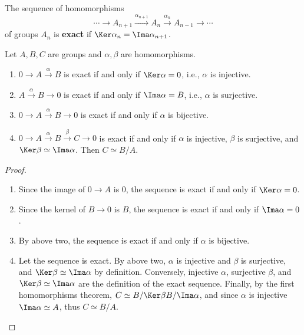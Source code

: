 \begin{defn}
The sequence of homomorphisms
\begin{equation}
\cdots\rightarrow A_{n+1}\xrightarrow{\alpha_{n+1}}A_n\xrightarrow{\alpha_{n}} A_{n-1}\rightarrow \cdots
\end{equation}
of groups $A_{n}$ is \textbf{exact} if $\Ker \alpha_n=\Ima \alpha_{n+1}$.
\end{defn}

\begin{prop} Let $A,B,C$ are groups and $\alpha,\beta$ are homomorphisms.
\begin{enumerate}
\item $0\rightarrow A\xrightarrow{\alpha}B$ is exact if and only if $\Ker \alpha=0$, i.e., $\alpha$ is injective.
\item $A\xrightarrow{\alpha} B\rightarrow 0$ is exact if and only if $\Ima\alpha=B$, i.e., $\alpha$ is surjective.
\item $0\rightarrow A\xrightarrow{\alpha} B\rightarrow 0$ is exact if and only if $\alpha$ is bijective.
\item $0\rightarrow A\xrightarrow{\alpha} B\xrightarrow{\beta} C\rightarrow 0$ is exact if and only if $\alpha$ is injective, $\beta$ is surjective, and $\Ker\beta\simeq \Ima\alpha$. Then $C\simeq B/A$.
\end{enumerate}
\end{prop}
\begin{proof}
\begin{enumerate}
\item Since the image of $0\rightarrow A$ is $0$, the sequence is exact if and only if $\Ker\alpha=0$.
\item Since the kernel of $B\rightarrow 0$ is $B$, the sequence is exact if and only if $\Ima\alpha=0$.
\item By above two, the sequence is exact if and only if $\alpha$ is bijective.
\item Let the sequence is exact. By above two, $\alpha$ is injective and $\beta$ is surjective, and $\Ker\beta\simeq \Ima\alpha$ by definition. Conversely, injective $\alpha$, surjective $\beta$, and $\Ker\beta\simeq \Ima\alpha$ are the definition of the exact sequence. Finally, by the first homomorphisms theorem, $C\simeq B/\Ker\beta B/\Ima\alpha$, and since $\alpha$ is injective $\Ima\alpha\simeq A$, thus $C\simeq B/A$.
\end{enumerate}
\end{proof}

